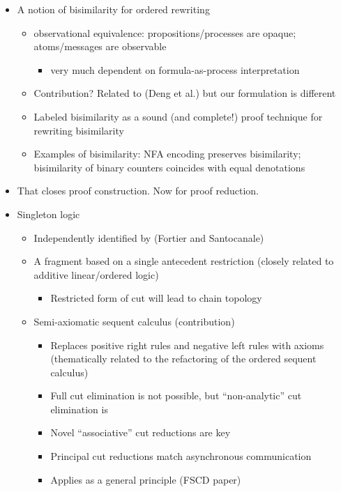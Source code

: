 \begin{itemize}
\item A notion of bisimilarity for ordered rewriting
  \begin{itemize}[nosep]
  \item observational equivalence: propositions/processes are opaque; atoms/messages are observable 
    \begin{itemize}[nosep]
    \item very much dependent on formula-as-process interpretation
    \end{itemize}
  \item Contribution?  Related to (Deng et al.) but our formulation is different
  \item Labeled bisimilarity as a sound (and complete!) proof technique for rewriting bisimilarity
  \item Examples of bisimilarity: NFA encoding preserves bisimilarity; bisimilarity of binary counters coincides with equal denotations 
  \end{itemize}

\item That closes proof construction.  Now for proof reduction.

\item Singleton logic
  \begin{itemize}[nosep]
  \item Independently identified by (Fortier and Santocanale)
  \item A fragment based on a single antecedent restriction (closely related to additive linear/ordered logic) 
    \begin{itemize}[nosep]
    \item Restricted form of cut will lead to chain topology
    \end{itemize}
  \item Semi-axiomatic sequent calculus (contribution)
    \begin{itemize}[nosep]
    \item Replaces positive right rules and negative left rules with axioms (thematically related to the refactoring of the ordered sequent calculus)
    \item Full cut elimination is not possible, but \enquote{non-analytic} cut elimination is 
    \item Novel \enquote{associative} cut reductions are key 
    \item Principal cut reductions match asynchronous communication
    \item Applies as a general principle (FSCD paper)
    \end{itemize}
  \end{itemize}


\end{itemize}
